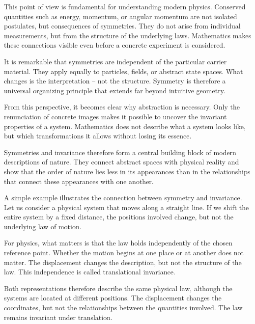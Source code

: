 This point of view is fundamental
for understanding modern physics.
Conserved quantities
such as energy,
momentum,
or angular momentum
are not isolated postulates,
but consequences of symmetries.
They do not arise from individual measurements,
but from the structure of the underlying laws.
Mathematics makes these connections visible
even before a concrete experiment is considered.

It is remarkable
that symmetries are independent
of the particular carrier material.
They apply equally to particles,
fields,
or abstract state spaces.
What changes
is the interpretation --
not the structure.
Symmetry is therefore
a universal organizing principle
that extends far beyond intuitive geometry.

From this perspective, it becomes clear
why abstraction is necessary.
Only the renunciation of concrete images
makes it possible
to uncover the invariant properties of a system.
Mathematics does not describe
what a system looks like,
but which transformations it allows
without losing its essence.

Symmetries and invariance
therefore form a central building block
of modern descriptions of nature.
They connect abstract spaces
with physical reality
and show
that the order of nature
lies less in its appearances
than in the relationships
that connect these appearances with one another.

A simple example illustrates
the connection between symmetry and invariance.
Let us consider a physical system
that moves along a straight line.
If we shift the entire system
by a fixed distance,
the positions involved change,
but not the underlying law of motion.

For physics, what matters is
that the law holds independently of the chosen reference point.
Whether the motion begins at one place
or at another
does not matter.
The displacement changes the description,
but not the structure of the law.
This independence
is called translational invariance.

Both representations therefore describe the same physical law,
although the systems are located at different positions.
The displacement changes the coordinates,
but not the relationships between the quantities involved.
The law remains invariant under translation.

